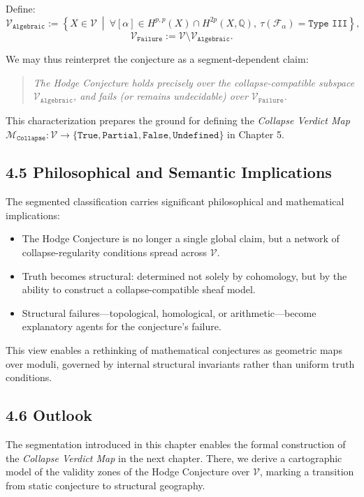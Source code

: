 \documentclass[11pt]{article}
\begin{document}
Define:
\[
\mathcal{V}_{\texttt{Algebraic}} := \left\{ X \in \mathcal{V} \ \middle|\ \forall [\alpha] \in H^{p,p}(X) \cap H^{2p}(X, \mathbb{Q}), \ \tau(\mathcal{F}_\alpha) = \texttt{Type III} \right\},
\]
\[
\mathcal{V}_{\texttt{Failure}} := \mathcal{V} \setminus \mathcal{V}_{\texttt{Algebraic}}.
\]

We may thus reinterpret the conjecture as a segment-dependent claim:

\begin{quote}
\emph{The Hodge Conjecture holds precisely over the collapse-compatible subspace $\mathcal{V}_{\texttt{Algebraic}}$, and fails (or remains undecidable) over $\mathcal{V}_{\texttt{Failure}}$.}
\end{quote}

This characterization prepares the ground for defining the \emph{Collapse Verdict Map} $\mathcal{M}_{\texttt{Collapse}} : \mathcal{V} \to \{ \texttt{True}, \texttt{Partial}, \texttt{False}, \texttt{Undefined} \}$ in Chapter 5.

\subsection{4.5 Philosophical and Semantic Implications}

The segmented classification carries significant philosophical and mathematical implications:

\begin{itemize}
  \item The Hodge Conjecture is no longer a single global claim, but a network of collapse-regularity conditions spread across $\mathcal{V}$.
  \item Truth becomes structural: determined not solely by cohomology, but by the ability to construct a collapse-compatible sheaf model.
  \item Structural failures—topological, homological, or arithmetic—become explanatory agents for the conjecture’s failure.
\end{itemize}

This view enables a rethinking of mathematical conjectures as geometric maps over moduli, governed by internal structural invariants rather than uniform truth conditions.

\subsection{4.6 Outlook}

The segmentation introduced in this chapter enables the formal construction of the \emph{Collapse Verdict Map} in the next chapter. There, we derive a cartographic model of the validity zones of the Hodge Conjecture over $\mathcal{V}$, marking a transition from static conjecture to structural geography.
\end{document}
